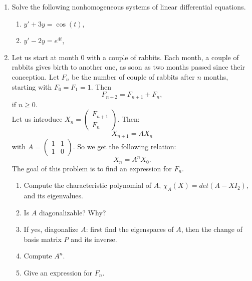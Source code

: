 \documentclass{article}
\begin{document}
\begin{enumerate}
\newpage 

\item Solve the following nonhomogeneous systems of linear differential equations. 
\begin{enumerate}
\item $y' +3y = \cos (t)$,
\item $y' -2 y = e^{4t} $,
\end{enumerate}

\newpage
\item %
Let us start at month $0$ with a couple of rabbits. Each month, a couple of rabbits gives birth to another one, as soon as two months passed since their conception. Let $F_n$ be the number of couple of rabbits after $n$ months, starting with $F_0 = F_1 = 1$. Then 
\[F_{n+2} = F_{n+1}+ F_n,\]
if $n\geq 0$.\\
Let us introduce $X_n = \begin{pmatrix} F_{n+1} \\ F_{n}\end{pmatrix}$. Then:
\[X_{n+1} = A X_n\]
with $A=\begin{pmatrix} 1 & 1 \\ 1 & 0 \end{pmatrix}$. So we get the following relation:
\[X_n = A^n X_0.\]
The goal of this problem is to find an expression for $F_n$.

\begin{enumerate}
\item Compute the characteristic polynomial of $A$, $\chi_A(X)=det (A-X I_2)$, and its eigenvalues.
\item Is $A$ diagonalizable? Why?
\item If yes, diagonalize $A$: first find the eigenspaces of $A$, then the change of basis matrix $P$ and its inverse.   
\item Compute $A^n$. 
\item Give an expression for $F_n$.
\end{enumerate}

\newpage
\

\newpage
\


	\thispagestyle{empty}

	\thispagestyle{empty}
\end{enumerate}
\end{document}
